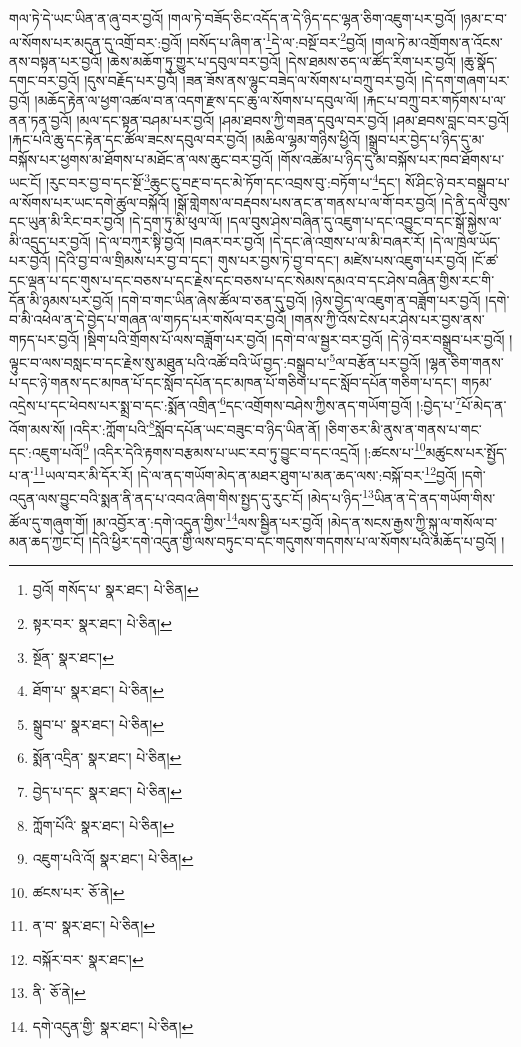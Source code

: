 གལ་ཏེ་དེ་ཡང་ཡིན་ན་ཞུ་བར་བྱའོ། །གལ་ཏེ་བཟོད་ཅིང་འདོད་ན་དེ་ཉིད་དང་ལྷན་ཅིག་འཇུག་པར་བྱའོ། །ཉམ་ང་བ་ལ་སོགས་པར་མདུན་དུ་འགྲོ་བར་:བྱའོ། །བསོད་པ་ཞིག་ན་\footnote{བྱའོ། གསོད་པ་  སྣར་ཐང་།  པེ་ཅིན། }དེ་ལ་:བསྔོ་བར་\footnote{སྟར་བར་  སྣར་ཐང་།  པེ་ཅིན། }བྱའོ། །གལ་ཏེ་མ་འགྲོགས་ན་འོངས་ནས་བསྟན་པར་བྱའོ། །ཆེས་མཆོག་ཏུ་གྱུར་པ་དབུལ་བར་བྱའོ། །དེས་ཐམས་ཅད་ལ་ཚོད་རིག་པར་བྱའོ། །ཆུ་སྣོད་དགང་བར་བྱའོ། །དུས་བརྗོད་པར་བྱའོ། །ཟན་ཟོས་ནས་ལྷུང་བཟེད་ལ་སོགས་པ་བཀྲུ་བར་བྱའོ། །དེ་དག་གཞག་པར་བྱའོ། །མཆོད་རྟེན་ལ་ཕྱག་འཚལ་བ་ན་འདག་རྫས་དང་ཆུ་ལ་སོགས་པ་དབུལ་ལོ། །རྐང་པ་བཀྲུ་བར་གཏོགས་པ་ལ་ནན་ཏན་བྱའོ། །མལ་དང་སྟན་བཤམ་པར་བྱའོ། །ཤམ་ཐབས་ཀྱི་གཟན་དབུལ་བར་བྱའོ། །ཤམ་ཐབས་བླང་བར་བྱའོ། །རྐང་པའི་ཆུ་དང་རྟེན་དང་ཚོལ་ཟངས་དབུལ་བར་བྱའོ། །མཆིལ་ལྷམ་གཉིས་ཕྱིའོ། །སྒྲུབ་པར་བྱེད་པ་ཉིད་དུ་མ་བསྐོས་པར་ཕྱགས་མ་ཐོགས་པ་མཐོང་ན་ལས་ཆུང་བར་བྱའོ། །གོས་འཚེམ་པ་ཉིད་དུ་མ་བསྐོས་པར་ཁབ་ཐོགས་པ་ཡང་ངོ། །རུང་བར་བྱ་བ་དང་སྔོ་\footnote{སྔོན་  སྣར་ཐང་། }ཆུང་ངུ་བརྔ་བ་དང་མེ་ཏོག་དང་འབྲས་བུ་:བཏོག་པ་\footnote{ཐོག་པ་  སྣར་ཐང་།  པེ་ཅིན། }དང་། སོ་ཤིང་ཉེ་བར་བསྒྲུབ་པ་ལ་སོགས་པར་ཡང་དགེ་ཚུལ་བསྐོའོ། །སྒོ་གླེགས་ལ་བརྡབས་པས་ནང་ན་གནས་པ་ལ་གོ་བར་བྱའོ། །དེ་ནི་དལ་བུས་དང་ཡུན་མི་རིང་བར་བྱའོ། །དེ་དྲག་ཏུ་མི་ཕུལ་ལོ། །དལ་བུས་ཤེས་བཞིན་དུ་འཇུག་པ་དང་འབྱུང་བ་དང་སྒོ་སྐྱེས་ལ་མི་འདྲུད་པར་བྱའོ། །དེ་ལ་བཀུར་སྟི་བྱའོ། །བཞར་བར་བྱའོ། །དེ་དང་ཞེ་འགྲས་པ་ལ་མི་བཞར་རོ། །དེ་ལ་ཁྲེལ་ཡོད་པར་བྱའོ། །དེའི་བྱ་བ་ལ་གྲིམས་པར་བྱ་བ་དང་། གུས་པར་བྱས་ཏེ་བྱ་བ་དང་། མཛེས་པས་འཇུག་པར་བྱའོ། །ངོ་ཚ་དང་ལྡན་པ་དང་གུས་པ་དང་བཅས་པ་དང་རྗེས་དང་བཅས་པ་དང་སེམས་དམའ་བ་དང་ཤེས་བཞིན་གྱིས་རང་གི་དོན་མི་ཉམས་པར་བྱའོ། །དགེ་བ་གང་ཡིན་ཞེས་ཚོལ་བ་ཅན་དུ་བྱའོ། །ཉེས་བྱེད་ལ་འཇུག་ན་བཟློག་པར་བྱའོ། །དགེ་བ་མི་འཕེལ་ན་དེ་བྱེད་པ་གཞན་ལ་གཏད་པར་གསོལ་བར་བྱའོ། །གནས་ཀྱི་འོས་ངེས་པར་ཤེས་པར་བྱས་ནས་གཏད་པར་བྱའོ། །སྡིག་པའི་གྲོགས་པོ་ལས་བཟློག་པར་བྱའོ། །དགེ་བ་ལ་སྦྱར་བར་བྱའོ། །དེ་ཉེ་བར་བསྒྲུབ་པར་བྱའོ། །ལྟུང་བ་ལས་བསླང་བ་དང་རྗེས་སུ་མཐུན་པའི་འཚོ་བའི་ཡོ་བྱད་:བསྒྲུབ་པ་\footnote{སྒྲུབ་པ་  སྣར་ཐང་།  པེ་ཅིན། }ལ་བརྩོན་པར་བྱའོ། །ལྷན་ཅིག་གནས་པ་དང་ཉེ་གནས་དང་མཁན་པོ་དང་སློབ་དཔོན་དང་མཁན་པོ་གཅིག་པ་དང་སློབ་དཔོན་གཅིག་པ་དང་། གཏམ་འདྲེས་པ་དང་ཕེབས་པར་སྨྲ་བ་དང་:སྨོན་འགྲིན་\footnote{སྨོན་འདྲིན་  སྣར་ཐང་།  པེ་ཅིན། }དང་འགྲོགས་བཤེས་ཀྱིས་ནད་གཡོག་བྱའོ། །:བྱེད་པ་\footnote{བྱེད་པ་དང་  སྣར་ཐང་།  པེ་ཅིན། }པོ་མེད་ན་འོག་མས་སོ། །འདིར་:ཀློག་པའི་\footnote{ཀློག་པོའི་  སྣར་ཐང་།  པེ་ཅིན། }སློབ་དཔོན་ཡང་བཟུང་བ་ཉིད་ཡིན་ནོ། །ཅིག་ཅར་མི་ནུས་ན་གནས་པ་གང་དང་:འཇུག་པའོ།\footnote{འཇུག་པའི་འོ།  སྣར་ཐང་།  པེ་ཅིན། } །འདིར་དེའི་རྟགས་བརྩམས་པ་ཡང་རབ་ཏུ་བྱུང་བ་དང་འདྲའོ། །:ཚངས་པ་\footnote{ཚངས་པར་  ཅོ་ནེ། }མཚུངས་པར་སྤྱོད་པ་ན་\footnote{ན་བ་  སྣར་ཐང་།  པེ་ཅིན། }ཡལ་བར་མི་དོར་རོ། །དེ་ལ་ནད་གཡོག་མེད་ན་མཐར་ཐུག་པ་མན་ཆད་ལས་:བསྐོ་བར་\footnote{བསྐོར་བར་  སྣར་ཐང་། }བྱའོ། །དགེ་འདུན་ལས་བྱུང་བའི་སྨན་ནི་ནད་པ་འབའ་ཞིག་གིས་སྤྱད་དུ་རུང་ངོ། །མེད་པ་ཉིད་\footnote{ནི་  ཅོ་ནེ། }ཡིན་ན་དེ་ནད་གཡོག་གིས་ཚོལ་དུ་གཞུག་གོ། །མ་འབྱོར་ན་:དགེ་འདུན་གྱིས་\footnote{དགེ་འདུན་གྱི་  སྣར་ཐང་།  པེ་ཅིན། }ལས་སྦྱིན་པར་བྱའོ། །མེད་ན་སངས་རྒྱས་ཀྱི་སྐུ་ལ་གསོལ་བ་མན་ཆད་ཀྱང་ངོ། །དེའི་ཕྱིར་དགེ་འདུན་གྱི་ལས་བཏུང་བ་དང་གདུགས་གདགས་པ་ལ་སོགས་པའི་མཆོད་པ་བྱའོ། །
